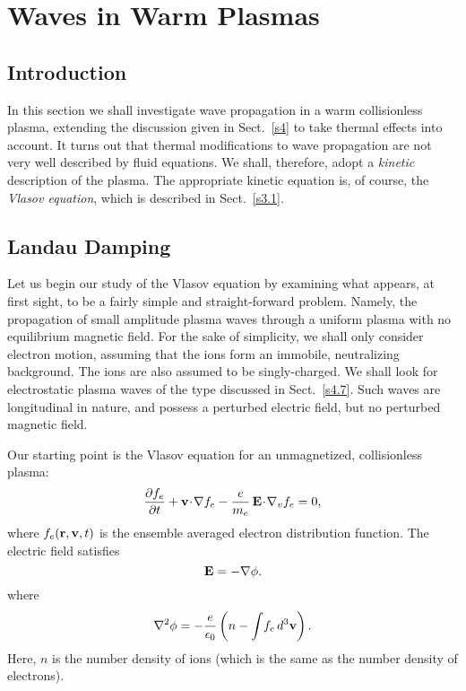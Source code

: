 \chapter{Waves in Warm Plasmas}
\section{Introduction}
In this section we shall investigate  wave propagation in a warm collisionless
plasma, extending the discussion given in Sect.~\ref{s4} to take 
thermal effects into account. It turns out that  thermal modifications to
wave
propagation are not very well
described by fluid equations. We shall, therefore, adopt  a {\em kinetic}\/ 
description of the plasma. The appropriate kinetic equation is, of course,
the {\em Vlasov equation}, which is described in Sect.~\ref{s3.1}.

\section{Landau Damping}\label{s6.2}
Let us begin our study of the Vlasov equation by
examining what appears, at first sight, to be a fairly simple and
straight-forward problem. Namely, the propagation of
small amplitude plasma waves through  a uniform plasma with no
equilibrium magnetic field. For the sake of simplicity, we shall only consider
 electron motion, assuming that the ions form an immobile,
neutralizing background. The ions are also  assumed to
be singly-charged.
We shall look for  electrostatic
plasma waves of the type discussed in Sect.~\ref{s4.7}. Such waves 
are longitudinal in nature, and possess
a perturbed electric field, but no perturbed magnetic field.

Our starting point is the Vlasov equation for an unmagnetized, collisionless
plasma:
\begin{equation}\label{e6.1}
\frac{\partial f_e}{\partial t} + {\bf v}\!\cdot\!\nabla f_e - \frac{e}{m_e}\,
{\bf E}\!\cdot\!\nabla_v f_e = 0,
\end{equation}
where $f_e({\bf r},{\bf v}, t)$ is the ensemble averaged electron distribution
function. The electric field satisfies
\begin{equation}\label{e6.2}
{\bf E} = -\nabla\phi.
\end{equation}
where
\begin{equation}\label{e6.3}
\nabla^2\phi = -\frac{e}{\epsilon_0}\left(n-\int \!f_e\,d^3{\bf v}\right).
\end{equation}
Here, $n$ is the number density of ions (which is the same
as the number density of electrons). 

